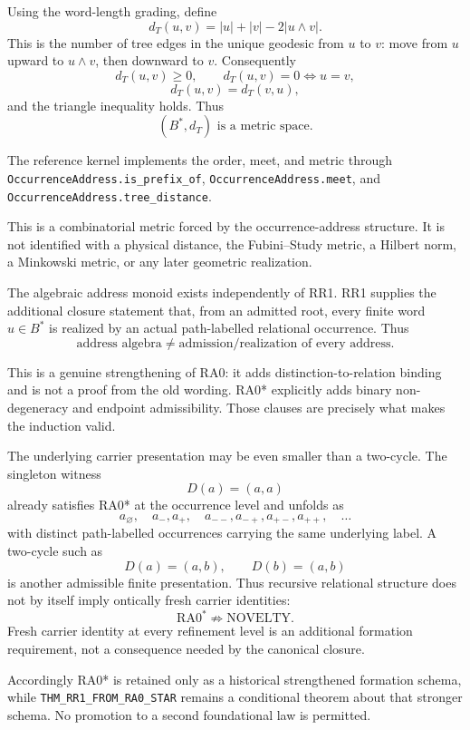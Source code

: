 \documentclass[11pt]{article}
\newcommand{\claimid}[1]{\nolinkurl{#1}}
\newcommand{\codeid}[1]{\nolinkurl{#1}}
\begin{document}
Using the word-length grading, define
\[
\boxed{
d_T(u,v)
=
|u|+|v|-2|u\wedge v|.
}
\]
This is the number of tree edges in the unique geodesic from \(u\) to
\(v\): move from \(u\) upward to \(u\wedge v\), then downward to \(v\).
Consequently
\[
d_T(u,v)\ge0,
\qquad
d_T(u,v)=0\Longleftrightarrow u=v,
\]
\[
d_T(u,v)=d_T(v,u),
\]
and the triangle inequality holds. Thus
\[
\boxed{
(B^*,d_T)
\text{ is a metric space.}
}
\]

The reference kernel implements the order, meet, and metric through
\codeid{OccurrenceAddress.is_prefix_of},
\codeid{OccurrenceAddress.meet}, and
\codeid{OccurrenceAddress.tree_distance}.

This is a combinatorial metric forced by the occurrence-address structure.
It is not identified with a physical distance, the Fubini--Study metric, a
Hilbert norm, a Minkowski metric, or any later geometric realization.

The algebraic address monoid exists independently of RR1. RR1 supplies the
additional closure statement that, from an admitted root, every finite word
\(u\in B^*\) is realized by an actual path-labelled relational occurrence.
Thus
\[
\boxed{
\text{address algebra}
\neq
\text{admission/realization of every address}.
}
\]

This is a genuine strengthening of RA0: it adds distinction-to-relation
binding and is not a proof from the old wording.
RA0* explicitly adds binary non-degeneracy and endpoint admissibility. Those
clauses are precisely what makes the induction valid.

The underlying carrier presentation may be even smaller than a two-cycle. The
singleton witness
\[
D(a)=(a,a)
\]
already satisfies RA0* at the occurrence level and unfolds as
\[
a_{\varnothing},
\quad
a_-,a_+,
\quad
a_{--},a_{-+},a_{+-},a_{++},
\quad\ldots
\]
with distinct path-labelled occurrences carrying the same underlying label.
A two-cycle such as
\[
D(a)=(a,b),
\qquad
D(b)=(a,b)
\]
is another admissible finite presentation. Thus recursive relational structure
does not by itself imply ontically fresh carrier identities:
\[
\boxed{
\mathrm{RA0}^{*}\not\Rightarrow\mathrm{NOVELTY}.
}
\]
Fresh carrier identity at every refinement level is an additional formation
requirement, not a consequence needed by the canonical closure.

Accordingly RA0* is retained only as a historical strengthened formation
schema, while \claimid{THM_RR1_FROM_RA0_STAR} remains a conditional theorem
about that stronger schema. No promotion to a second foundational law is
permitted.
\end{document}
